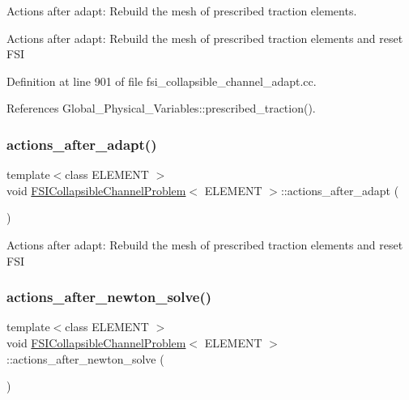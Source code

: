 Actions after adapt\+: Rebuild the mesh of prescribed traction elements. 

Actions after adapt\+: Rebuild the mesh of prescribed traction elements and reset F\+SI 

Definition at line 901 of file fsi\+\_\+collapsible\+\_\+channel\+\_\+adapt.\+cc.



References Global\+\_\+\+Physical\+\_\+\+Variables\+::prescribed\+\_\+traction().

\mbox{\label{classFSICollapsibleChannelProblem_ae20eb7ed895e0063ade5a6d0c6f9af2f}} 
\subsubsection{\texorpdfstring{actions\+\_\+after\+\_\+adapt()}{actions\_after\_adapt()}\hspace{0.1cm}{\footnotesize\ttfamily [2/2]}}
{\footnotesize\ttfamily template$<$class E\+L\+E\+M\+E\+NT $>$ \\
void \hyperlink{classFSICollapsibleChannelProblem}{F\+S\+I\+Collapsible\+Channel\+Problem}$<$ E\+L\+E\+M\+E\+NT $>$\+::actions\+\_\+after\+\_\+adapt (\begin{DoxyParamCaption}{ }\end{DoxyParamCaption})}

Actions after adapt\+: Rebuild the mesh of prescribed traction elements and reset F\+SI \mbox{\label{classFSICollapsibleChannelProblem_a49780267c05f4c6ecbed11bfc6b9956b}} 
\subsubsection{\texorpdfstring{actions\+\_\+after\+\_\+newton\+\_\+solve()}{actions\_after\_newton\_solve()}\hspace{0.1cm}{\footnotesize\ttfamily [1/4]}}
{\footnotesize\ttfamily template$<$class E\+L\+E\+M\+E\+NT $>$ \\
void \hyperlink{classFSICollapsibleChannelProblem}{F\+S\+I\+Collapsible\+Channel\+Problem}$<$ E\+L\+E\+M\+E\+NT $>$\+::actions\+\_\+after\+\_\+newton\+\_\+solve (\begin{DoxyParamCaption}{ }\end{DoxyParamCaption})\hspace{0.3cm}{\ttfamily [inline]}}



